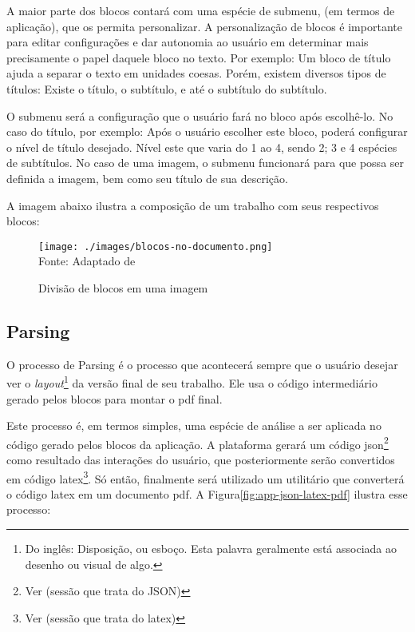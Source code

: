 A maior parte dos blocos contará com uma espécie de submenu, (em termos de aplicação),
que os permita personalizar. A personalização de blocos é importante para editar
configurações e dar autonomia ao usuário em determinar mais precisamente o papel
daquele bloco no texto. Por exemplo: Um bloco de título ajuda a separar o texto
em unidades coesas. Porém, existem diversos tipos de títulos: Existe o título, o
subtítulo, e até o subtítulo do subtítulo.

O submenu será a configuração que o usuário fará no bloco após escolhê-lo. No
caso do título, por exemplo: Após o usuário escolher este bloco, poderá configurar
o nível de título desejado. Nível este que varia do 1 ao 4, sendo 2; 3 e 4
espécies de subtítulos. No caso de uma imagem, o submenu funcionará para que possa
ser definida a imagem, bem como seu título de sua descrição.

A imagem abaixo ilustra a composição de um trabalho com seus respectivos blocos:

\begin{figure}[ht]
    \centering
    \caption{Divisão de blocos em uma imagem}
    \texttt{[image: ./images/blocos-no-documento.png]}
    \label{fig:blocos-no-documento} \\
    \textnormal{\fontsize{10pt}{12pt}Fonte: Adaptado de \cite{pucgo}}
\end{figure}

\subsection{Parsing}

O processo de Parsing é o processo que acontecerá sempre que o usuário desejar
ver o
\textit{layout}\footnote{Do inglês: Disposição, ou esboço. Esta palavra geralmente está associada ao desenho ou visual de algo.
}
da versão final de seu trabalho. Ele usa o código intermediário gerado pelos blocos para montar o
\acrshort{pdf}
final.

Este processo é, em termos simples, uma espécie de análise a ser aplicada no código gerado pelos blocos
da aplicação. A plataforma gerará um código
\acrshort{json}\footnote{Ver (sessão que trata do JSON)
}
como resultado das interações do usuário, que posteriormente
serão convertidos em código
latex\footnote{Ver (sessão que trata do latex)
}.
Só então, finalmente será utilizado um utilitário que converterá o código latex
em um documento
\acrshort{pdf}. A
Figura\ref{fig:app-json-latex-pdf} ilustra esse processo:

